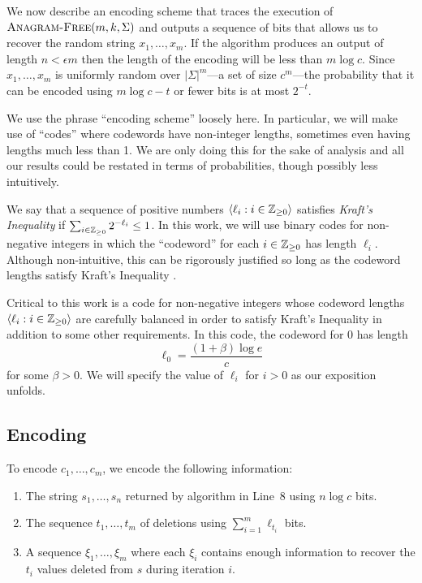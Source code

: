 \documentclass{patmorin}
\begin{document}
We now describe an encoding scheme that traces the execution of $\textsc{Anagram-Free}(m, k, \Sigma)$ and outputs a sequence of bits that allows us to recover the random string $x_1,\ldots,x_m$.  If the algorithm produces an output of length $n < \epsilon m$ then the length of the encoding will be less than $m\log c$.  Since $x_1,\ldots,x_m$ is uniformly random over $|\Sigma|^m$---a set of size $c^m$---the probability that it can be encoded using $m\log c - t$ or fewer bits is at most $2^{-t}$.

We use the phrase ``encoding scheme'' loosely here.  In particular, we will make use of ``codes'' where codewords have non-integer lengths, sometimes even having lengths much less than 1.  We are only doing this for the sake of analysis and all our results could be restated in terms of probabilities, though possibly less intuitively.

We say that a sequence of positive numbers $\langle \ell_i : i\in\mathbb{Z}_{\ge 0}\rangle$ satisfies \emph{Kraft's Inequality} if $\sum_{i\in\mathbb{Z}_{\ge 0}} 2^{-\ell_i} \le 1$.  In this work, we will use binary codes for non-negative integers in which the ``codeword'' for each $i\in\mathbb{Z}_{\ge 0}$ has length $\ell_i$.  Although non-intuitive, this can be rigorously justified so long as the codeword lengths satisfy Kraft's Inequality \cite[Section~7]{morin.mulzer.ea:encoding}.

Critical to this work is a code for non-negative integers whose codeword lengths $\langle \ell_i:i\in\mathbb{Z}_{\ge0}\rangle$ are carefully balanced in order to satisfy Kraft's Inequality in addition to some other requirements.  In this code, the codeword for 0 has length
\[
     \ell_0 = \frac{(1+\beta)\log e}{c}
\]
for some $\beta >0$.  We will specify the value of $\ell_i$ for $i>0$ as our exposition unfolds.

\subsection{Encoding}

To encode $c_1,\ldots,c_m$, we encode the following information:
\begin{enumerate}
  \item The string $s_1,\ldots,s_n$ returned by algorithm in Line~8 using $n\log c$ bits.
  \item The sequence $t_1,\ldots,t_m$ of deletions using $\sum_{i=1}^m \ell_{t_i}$ bits.
  \item A sequence $\xi_1,\ldots,\xi_m$ where each $\xi_i$ contains enough information to recover the $t_i$ values deleted from $s$ during iteration $i$.
\end{enumerate}
\end{document}
